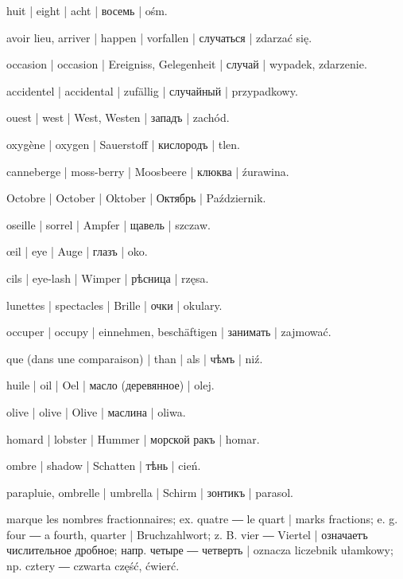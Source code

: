 \begin{outdent}{1em}
huit | eight | acht | восемь | ośm.

avoir lieu, arriver | happen | vorfallen | случаться | zdarzać się.

\uvsubentry{}
occasion | occasion | Ereigniss, Gelegenheit | случай | wypadek, zdarzenie.


\uvsubentry{}
accidentel | accidental | zufällig | случайный | przypadkowy.

ouest | west | West, Westen | западъ | zachód.

oxygène | oxygen | Sauerstoff | кислородъ | tlen.

canneberge | moss-berry | Moosbeere | клюква | źurawina.

Octobre | October | Oktober | Октябрь | Październik.

oseille | sorrel | Ampfer | щавель | szczaw.

œil | eye | Auge | глазъ | oko.

\uvsubentry{}
cils | eye-lash | Wimper | рѣсница | rzęsa.


\uvsubentry{}
lunettes | spectacles | Brille | очки | okulary.

occuper | occupy | einnehmen, beschäftigen | занимать | zajmować.

que (dans une comparaison) | than | als | чѣмъ | niź.

huile | oil | Oel | масло (деревянное) | olej.

olive | olive | Olive | маслина | oliwa.

homard | lobster | Hummer | морской ракъ | homar.

ombre | shadow | Schatten | тѣнь | cień.

parapluie, ombrelle | umbrella | Schirm | зонтикъ | parasol.

marque les nombres fractionnaires; ex.  quatre ―
 le quart | marks fractions; e. g.  four ―
 a fourth, quarter | Bruchzahlwort; z. B.  vier ―
 Viertel | означаетъ числительное дробное; напр. 
четыре ―  четверть | oznacza liczebnik ułamkowy;
np.  cztery ―  czwarta część, ćwierć.


\end{outdent}
